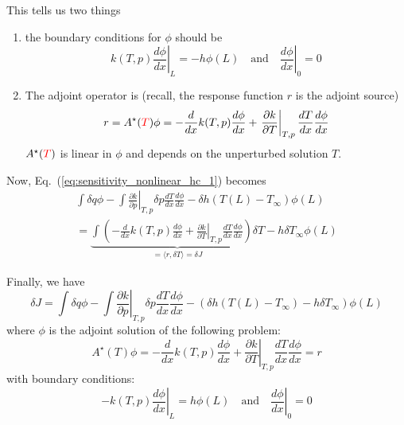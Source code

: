 \documentclass[11pt]{article}
\newcommand{\eqt}[1]{Eq.~(\ref{#1})}                     %
\newcommand{\be}{\begin{equation}}
\newcommand{\ee}{\end{equation}}
\newcommand{\tcr}[1]{\textcolor{red}{#1}}
\begin{document}
This tells us two things
\begin{enumerate}
\item the boundary conditions for $\phi$ should be
\[
\left.k(T,p)\frac{d\phi}{dx}\right|_L = -h\phi(L) \quad \text{and} \quad \left.\frac{d\phi}{dx}\right|_0 = 0
\]
\item The adjoint operator is (recall, the response function $r$ is the adjoint source)
\[
r=A^\star(\tcr{T}) \phi  = -\frac{d}{dx}k(T,p)\frac{d\phi}{dx} + \left.\frac{\partial k}{\partial T}\right|_{T,p} \frac{dT}{dx}\frac{d\phi}{dx} 
\]
$A^\star(\tcr{T})$ is linear in $\phi$ and depends on the unperturbed solution $T$.
\end{enumerate}

Now, \eqt{eq:sensitivity_nonlinear_hc_1} becomes
\begin{multline}
\int \delta q\phi 
-\int \left.\frac{\partial k}{\partial p}\right|_{T,p}\delta p \frac{dT}{dx}\frac{d\phi}{dx} 
-\delta h(T(L)-T_\infty)  \phi(L)
\\=
\underbrace{
\int \left(
- \frac{d}{dx}k(T,p)\frac{d\phi}{dx} 
+ \left.\frac{\partial k}{\partial T}\right|_{T,p} \frac{dT}{dx}\frac{d\phi}{dx} 
\right) 
\delta T 
}
_{=\langle r,\delta T \rangle = \delta J}
-h\delta T_\infty \phi(L)
\end{multline}

Finally, we have
\be
\boxed{
\delta J = 
\int \delta q\phi 
-\int \left.\frac{\partial k}{\partial p}\right|_{T,p}\delta p \frac{dT}{dx}\frac{d\phi}{dx} 
-\left(\delta h(T(L)-T_\infty)  - h\delta T_\infty \right)\phi(L)
}
\ee
where $\phi$ is the adjoint solution of the following problem:
\[
A^\star(T) \phi  = -\frac{d}{dx}k(T,p)\frac{d\phi}{dx} + \left.\frac{\partial k}{\partial T}\right|_{T,p} \frac{dT}{dx}\frac{d\phi}{dx} = r
\]
with boundary conditions:
\[
-\left.k(T,p)\frac{d\phi}{dx}\right|_L = h\phi(L) \quad \text{and} \quad \left.\frac{d\phi}{dx}\right|_0 = 0
\]

\end{document}
